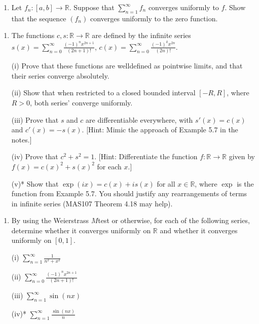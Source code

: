 \documentclass[letterpaper,10pt,english]{jupyterBook}
\begin{document}
\label{\detokenize{Problems:id60}}\begin{enumerate}
%
\setcounter{enumi}{59}
\item {} 
\sphinxAtStartPar
Let \(f_n:[a,b]\to\mathbb{R}\). Suppose that \(\sum_{n=1}^\infty f_n\) converges uniformly to \(f\). Show that the sequence \((f_n)\) converges uniformly to the zero function.

\end{enumerate}
\label{\detokenize{Problems:id61}}\begin{enumerate}
%
\setcounter{enumi}{60}
\item {} 
\sphinxAtStartPar
The functions \(c,s:\mathbb{R}\to\mathbb{R}\) are defined by the infinite series \(s(x) = \sum_{n=0}^\infty\frac{(-1)^nx^{2n+1}}{(2n+1)!}\), \(c(x) = \sum_{n=0}^\infty\frac{(-1)^kx^{2n}}{(2n)!}\).

\sphinxAtStartPar
(i) Prove that these functions are well\sphinxhyphen{}defined as pointwise limits, and that their series converge absolutely.

\sphinxAtStartPar
(ii) Show that when restricted to a closed bounded interval \([-R,R]\), where \(R>0\), both series’ converge uniformly.

\sphinxAtStartPar
(iii) Prove that \(s\) and \(c\) are differentiable everywhere, with \(s'(x)=c(x)\) and \(c'(x)=-s(x)\).
{[}Hint: Mimic the approach of Example 5.7 in the notes.{]}

\sphinxAtStartPar
(iv) Prove that \(c^2+s^2=1\). {[}Hint: Differentiate the function \(f:\mathbb{R}\to\mathbb{R}\) given by \(f(x)=c(x)^2+s(x)^2\) for each \(x\).{]}

\sphinxAtStartPar
(v)* Show that \(\exp(ix)=c(x)+is(x)\) for all \(x\in\mathbb{R}\), where \(\exp\) is the function from Example 5.7. You should justify any rearrangements of terms in infinite series (MAS107 Theorem 4.18 may help).

\end{enumerate}
\label{\detokenize{Problems:id62}}\begin{enumerate}
%
\setcounter{enumi}{61}
\item {} 
\sphinxAtStartPar
By using the Weierstrass \(M\)\sphinxhyphen{}test or otherwise, for each of the following series, determine whether it  converges uniformly on \(\mathbb{R}\) and  whether it converges uniformly on \([0,1]\).

\sphinxAtStartPar
(i) \(\displaystyle\sum_{n=1}^\infty \frac{1}{n^2 +x^2}\)

\sphinxAtStartPar
(ii) \(\displaystyle\sum_{n=0}^\infty \frac{(-1)^nx^{2n+1}}{(2n+1)!}\)

\sphinxAtStartPar
(iii) \(\displaystyle\sum_{n=1}^\infty \sin (nx)\)

\sphinxAtStartPar
(iv)* \(\displaystyle\sum_{n=1}^\infty \frac{\sin (nx)}{n}\)

\end{enumerate}
\end{document}
